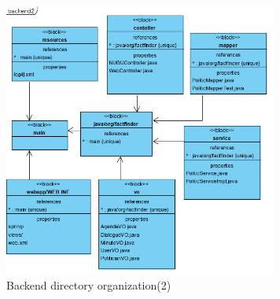 \documentclass[conference]{IEEEtran}
\begin{document}
\begin{figure}[htbp]
\centerline{\includegraphics[width=90mm,scale=0.5]{fig/backend2.png}}
\caption{Backend directory organization(2)}
\label{fig}
\end{figure}

 \vspace{50mm}
\end{document}

